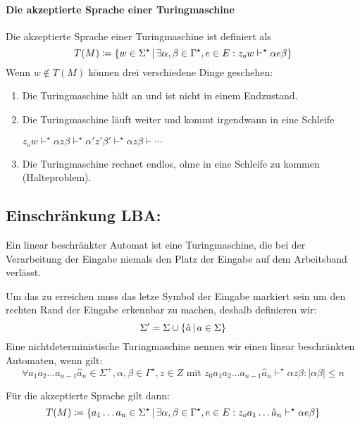 \paragraph{Die akzeptierte Sprache einer Turingmaschine}
Die akzeptierte Sprache einer Turingmaschine ist definiert als
\begin{equation*}
	T(M)\coloneqq\left\{ w\in\Sigma^\star \,\middle|\, \exists \alpha,\beta\in\Gamma^\star, e\in E: z_ow\vdash^\star \alpha e\beta \right\}
\end{equation*}
Wenn $w\not\in T(M)$ können drei verschiedene Dinge geschehen:
\begin{enumerate}
	\item Die Turingmaschine hält an und ist nicht in einem Endzustand.
	\item Die Turingmaschine läuft weiter und kommt irgendwann in eine Schleife

	$z_ow\vdash^\star \alpha z\beta\vdash^\star\alpha'z'\beta'\vdash^\star\alpha z\beta\vdash\cdots$
	\item Die Turingmaschine rechnet endlos, ohne in eine Schleife zu kommen (Halteproblem).
\end{enumerate}

\subsection{Einschränkung LBA:}
Ein linear beschränkter Automat ist eine Turingmaschine, die bei der Verarbeitung der Eingabe niemals den Platz der Eingabe auf dem Arbeitsband verlässt.

Um das zu erreichen muss das letze Symbol der Eingabe markiert sein um den rechten Rand der Eingabe erkennbar zu machen, deshalb definieren wir:
\begin{equation*}
	\Sigma'=\Sigma\cup\left\{ \hat a \,\middle|\, a\in\Sigma \right\}
\end{equation*}
Eine nichtdeterministische Turingmaschine nennen wir einen linear beschränkten Automaten, wenn gilt:
\begin{equation*}
	\forall a_1a_2\ldots a_{n-1}\hat a_n\in\Sigma^+, \alpha,\beta\in\Gamma^\star, z\in Z \text{ mit } z_0a_1a_2\ldots a_{n-1}\hat a_n\vdash^\star \alpha z \beta : |\alpha\beta|\leq n
\end{equation*}

Für die akzeptierte Sprache gilt dann:
\begin{equation*}
	T(M)\coloneqq\left\{ a_1\ldots a_n\in\Sigma^\star \,\middle|\, \exists \alpha,\beta\in\Gamma^\star, e\in E: z_oa_1\ldots\hat a_n\vdash^\star \alpha e\beta \right\}
\end{equation*}

